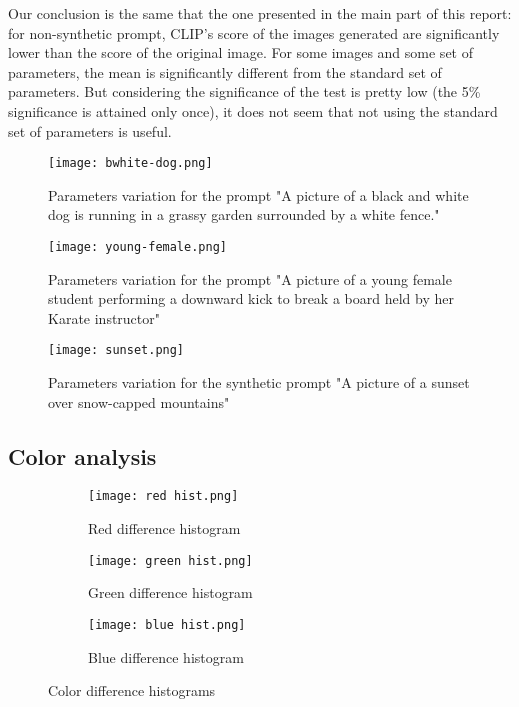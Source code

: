 \documentclass{article}
\begin{document}
\begin{appendix}
Our conclusion is the same that the one presented in the main part of this report: for non-synthetic prompt, CLIP's score of the images generated are significantly lower than the score of the original image. For some images and some set of parameters, the mean is significantly different from the standard set of parameters. But considering the significance of the test is pretty low (the 5\% significance is attained only once), it does not seem that not using the standard set of parameters is useful. 

\begin{figure}[h!]
    \centering
    \texttt{[image: bwhite-dog.png]}
    \caption{Parameters variation for the prompt "A picture of a black and white dog is running in a grassy garden surrounded by a white fence."}
    \label{fig:gen-bwhite-dog}
\end{figure}

\begin{figure}[h!]
    \centering
    \texttt{[image: young-female.png]}
    \caption{Parameters variation for the prompt "A picture of a young female student performing a downward kick to break a board held by her Karate instructor"}
    \label{fig:gen-young-female}
\end{figure}

\begin{figure}[h!]
    \centering
    \texttt{[image: sunset.png]}
    \caption{Parameters variation for the synthetic prompt "A picture of a 
    sunset over snow-capped mountains"}
    \label{fig:gen-sunset}
\end{figure}


\subsection{Color analysis}


\begin{figure}[H]
\begin{subfigure}{.5\textwidth}
  \centering
  \texttt{[image: red hist.png]}
  \caption{Red difference histogram}
  \label{fig:red_hist}
\end{subfigure}%
\begin{subfigure}{.5\textwidth}
  \centering
  \texttt{[image: green hist.png]}
  \caption{Green difference histogram}
  \label{fig:green_hist}
\end{subfigure}
\begin{subfigure}{.5\textwidth}
  \centering
  \texttt{[image: blue hist.png]}
  \caption{Blue difference histogram}
  \label{fig:blue_hist}
\end{subfigure}
\caption{Color difference histograms}
\label{fig:histograms}
\end{figure}


\end{appendix}
\end{document}
